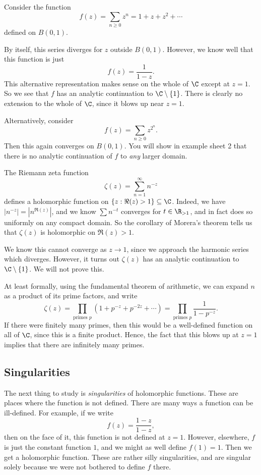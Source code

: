 \documentclass[a4paper]{article}
\begin{document}
\begin{eg}
  Consider the function
  \[
    f(z) = \sum_{n \geq 0} z^n = 1 + z + z^2 + \cdots
  \]
  defined on $B(0, 1)$.

  By itself, this series diverges for $z$ outside $B(0, 1)$. However, we know well that this function is just
  \[
    f(z) = \frac{1}{1 - z}.
  \]
  This alternative representation makes sense on the whole of $\C$ except at $z = 1$. So we see that $f$ has an analytic continuation to $\C \setminus \{1\}$. There is clearly no extension to the whole of $\C$, since it blows up near $z = 1$.
\end{eg}

\begin{eg}
  Alternatively, consider
  \[
    f(z) = \sum_{n \geq 0} z^{2^n}.
  \]
  Then this again converges on $B(0, 1)$. You will show in example sheet 2 that there is no analytic continuation of $f$ to \emph{any} larger domain.
\end{eg}

\begin{eg}
  The Riemann zeta function
  \[
    \zeta(z) = \sum_{n = 1}^\infty n^{-z}
  \]
  defines a holomorphic function on $\{z: \Re(z) > 1\} \subseteq \C$. Indeed, we have $|n^{-z}| = |n^{\Re(z)}|$, and we know $\sum n^{-t}$ converges for $t \in \R_{> 1}$, and in fact does so uniformly on any compact domain. So the corollary of Morera's theorem tells us that $\zeta(z)$ is holomorphic on $\Re(z) > 1$.

  We know this cannot converge as $z \to 1$, since we approach the harmonic series which diverges. However, it turns out $\zeta(z)$ has an analytic continuation to $\C \setminus \{1\}$. We will not prove this.

  At least formally, using the fundamental theorem of arithmetic, we can expand $n$ as a product of its prime factors, and write
  \[
    \zeta(z) = \prod_{\text{primes }p} (1 + p^{-z} + p^{-2z} + \cdots) = \prod_{\text{primes }p} \frac{1}{1 - p^{-z}}.
  \]
  If there were finitely many primes, then this would be a well-defined function on all of $\C$, since this is a finite product. Hence, the fact that this blows up at $z = 1$ implies that there are infinitely many primes.
\end{eg}

\subsection{Singularities}
The next thing to study is \emph{singularities} of holomorphic functions. These are places where the function is not defined. There are many ways a function can be ill-defined. For example, if we write
\[
  f(z) = \frac{1 - z}{1 - z},
\]
then on the face of it, this function is not defined at $z = 1$. However, elsewhere, $f$ is just the constant function $1$, and we might as well define $f(1) = 1$. Then we get a holomorphic function. These are rather silly singularities, and are singular solely because we were not bothered to define $f$ there.
\end{document}
